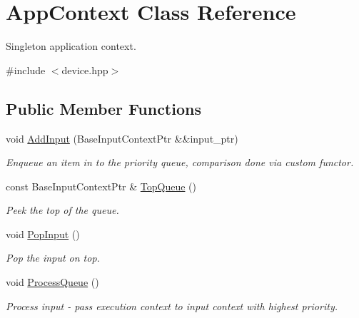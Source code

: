 \hypertarget{classAppContext}{}\section{App\+Context Class Reference}
\label{classAppContext}


Singleton application context.  




{\ttfamily \#include $<$device.\+hpp$>$}

\subsection*{Public Member Functions}
\begin{DoxyCompactItemize}
\item 
\mbox{\label{classAppContext_a273e111ce95ba5bfdda899c11472609d}} 
void \hyperlink{classAppContext_a273e111ce95ba5bfdda899c11472609d}{Add\+Input} (Base\+Input\+Context\+Ptr \&\&input\+\_\+ptr)
\begin{DoxyCompactList}\small\item\em Enqueue an item in to the priority queue, comparison done via custom functor. \end{DoxyCompactList}\item 
\mbox{\label{classAppContext_a7830bb8450df62a5d3f04f4b8c02d408}} 
const Base\+Input\+Context\+Ptr \& \hyperlink{classAppContext_a7830bb8450df62a5d3f04f4b8c02d408}{Top\+Queue} ()
\begin{DoxyCompactList}\small\item\em Peek the top of the queue. \end{DoxyCompactList}\item 
\mbox{\label{classAppContext_aa881b9f705c7fd51c34e68c4c2a0b503}} 
void \hyperlink{classAppContext_aa881b9f705c7fd51c34e68c4c2a0b503}{Pop\+Input} ()
\begin{DoxyCompactList}\small\item\em Pop the input on top. \end{DoxyCompactList}\item 
\mbox{\label{classAppContext_a111c4cd1df3382d9f52e700e579bceb5}} 
void \hyperlink{classAppContext_a111c4cd1df3382d9f52e700e579bceb5}{Process\+Queue} ()
\begin{DoxyCompactList}\small\item\em Process input -\/ pass execution context to input context with highest priority. \end{DoxyCompactList}\item 

\end{DoxyCompactItemize}
